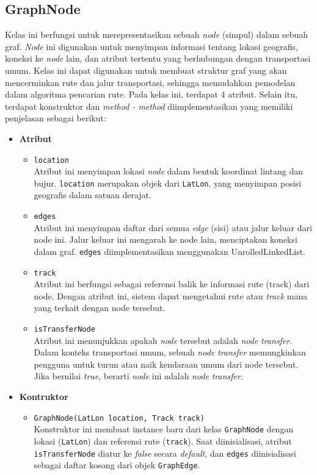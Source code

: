 \subsection{GraphNode}
Kelas ini berfungsi untuk merepresentasikan sebuah \textit{node} (simpul) dalam sebuah graf. \textit{Node} ini digunakan untuk menyimpan informasi tentang lokasi geografis, koneksi ke \textit{node} lain, dan atribut tertentu yang berhubungan dengan transportasi umum. Kelas ini dapat digunakan untuk membuat struktur graf yang akan mencerminkan rute dan jalur transportasi, sehingga memudahkan pemodelan dalam algoritma pencarian rute.
Pada kelas ini, terdapat 4 atribut. Selain itu, terdapat konstruktor dan \textit{method - method} diimplementasikan yang memiliki penjelasan sebagai berikut:
\begin{itemize}
    \item \textbf{Atribut}
    \begin{itemize}
        \item \texttt{location}
        \\ Atribut ini menyimpan lokasi \textit{node} dalam bentuk koordinat lintang dan bujur. \texttt{location} merupakan objek dari \texttt{LatLon}, yang menyimpan posisi geografis dalam satuan derajat.
        \item \texttt{edges}
        \\ Atribut ini menyimpan daftar dari semua \textit{edge} (sisi) atau jalur keluar dari node ini. Jalur keluar ini mengarah ke node lain, menciptakan koneksi dalam graf. \texttt{edges} diimplementasikan menggunakan UnrolledLinkedList.
        \item \texttt{track}
        \\ Atribut ini berfungsi sebagai referensi balik ke informasi rute (track) dari node. Dengan atribut ini, sistem dapat mengetahui rute atau \textit{track} mana yang terkait dengan node tersebut.
        \item \texttt{isTransferNode}
        \\ Atribut ini menunjukkan apakah \textit{node} tersebut adalah \textit{node} \textit{transfer}. Dalam konteks transportasi umum, sebuah \textit{node} \textit{transfer} memungkinkan pengguna untuk turun atau naik kendaraan umum dari node tersebut. Jika bernilai \textit{true}, berarti \textit{node} ini adalah \textit{node} \textit{transfer}.
    \end{itemize}

    \item \textbf{Kontruktor}
    \begin{itemize}
        \item \texttt{GraphNode(LatLon location, Track track)}
        \\ Konstruktor ini membuat instance baru dari kelas \texttt{GraphNode} dengan lokasi (\texttt{LatLon}) dan referensi rute (\texttt{track}). Saat diinisialisasi, atribut \texttt{isTransferNode} diatur ke \textit{false} secara \textit{default}, dan \texttt{edges} diinisialisasi sebagai daftar kosong dari objek \texttt{GraphEdge}.
    \end{itemize}


\end{itemize}
